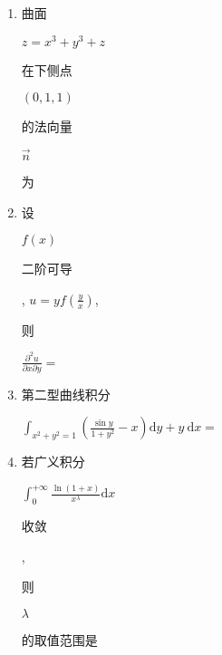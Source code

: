 \documentclass[10pt]{article}
\begin{document}
\begin{enumerate}
  \item \begin{CJK}{UTF8}{mj}曲面\end{CJK} $z=x^{3}+y^{3}+z$ \begin{CJK}{UTF8}{mj}在下侧点\end{CJK} $(0,1,1)$ \begin{CJK}{UTF8}{mj}的法向量\end{CJK} $\vec{n}$ \begin{CJK}{UTF8}{mj}为\end{CJK}

  \item \begin{CJK}{UTF8}{mj}设\end{CJK} $f(x)$ \begin{CJK}{UTF8}{mj}二阶可导\end{CJK}, $u=y f\left(\frac{y}{x}\right)$, \begin{CJK}{UTF8}{mj}则\end{CJK} $\frac{\partial^{2} u}{\partial x \partial y}=$

  \item \begin{CJK}{UTF8}{mj}第二型曲线积分\end{CJK} $\int_{x^{2}+y^{2}=1}\left(\frac{\sin y}{1+y^{2}}-x\right) \mathrm{d} y+y \mathrm{~d} x=$

  \item \begin{CJK}{UTF8}{mj}若广义积分\end{CJK} $\int_{0}^{+\infty} \frac{\ln (1+x)}{x^{\lambda}} \mathrm{d} x$ \begin{CJK}{UTF8}{mj}收敛\end{CJK}, \begin{CJK}{UTF8}{mj}则\end{CJK} $\lambda$ \begin{CJK}{UTF8}{mj}的取值范围是\end{CJK}

\end{enumerate}
\end{document}
